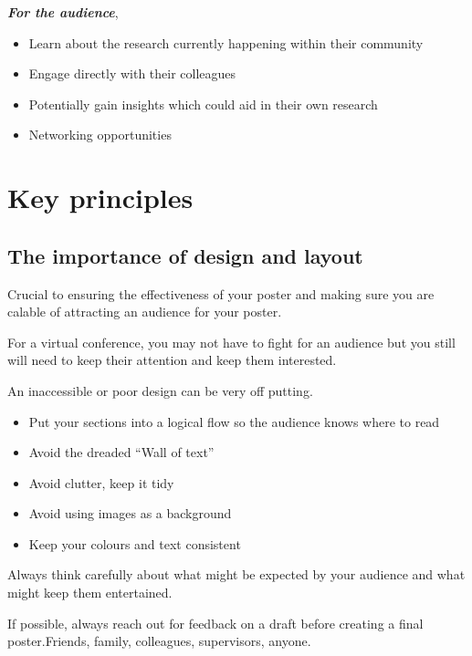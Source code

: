 \documentclass[
]{book}
\providecommand{\tightlist}{%
  \setlength{\itemsep}{0pt}\setlength{\parskip}{0pt}}
\begin{document}
\textbf{\emph{For the audience}},

\begin{itemize}
\tightlist
\item
  Learn about the research currently happening within their community
\item
  Engage directly with their colleagues
\item
  Potentially gain insights which could aid in their own research
\item
  Networking opportunities
\end{itemize}

\hypertarget{key-principles}{%
\section{Key principles}\label{key-principles}}

\hypertarget{the-importance-of-design-and-layout}{%
\subsection{The importance of design and layout}\label{the-importance-of-design-and-layout}}

Crucial to ensuring the effectiveness of your poster and making sure you are calable of attracting an audience for your poster.

For a virtual conference, you may not have to fight for an audience but you still will need to keep their attention and keep them interested.

An inaccessible or poor design can be very off putting.

\begin{itemize}
\tightlist
\item
  Put your sections into a logical flow so the audience knows where to read
\item
  Avoid the dreaded ``Wall of text''
\item
  Avoid clutter, keep it tidy
\item
  Avoid using images as a background
\item
  Keep your colours and text consistent
\end{itemize}

Always think carefully about what might be expected by your audience and what might keep them entertained.

If possible, always reach out for feedback on a draft before creating a final poster.Friends, family, colleagues, supervisors, anyone.
\end{document}
